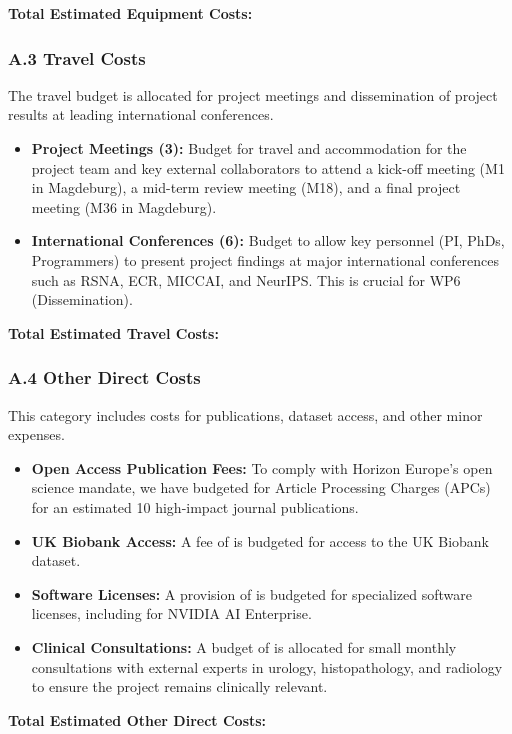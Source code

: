 \documentclass[11pt, a4paper]{article}
\begin{document}
\textbf{Total Estimated Equipment Costs: }

\subsubsection*{A.3 Travel Costs}
The travel budget is allocated for project meetings and dissemination of project results at leading international conferences.
\begin{itemize}
    \item \textbf{Project Meetings (3):} Budget for travel and accommodation for the project team and key external collaborators to attend a kick-off meeting (M1 in Magdeburg), a mid-term review meeting (M18), and a final project meeting (M36 in Magdeburg).
    \item \textbf{International Conferences (6):} Budget to allow key personnel (PI, PhDs, Programmers) to present project findings at major international conferences such as RSNA, ECR, MICCAI, and NeurIPS. This is crucial for WP6 (Dissemination).
\end{itemize}

\textbf{Total Estimated Travel Costs: }

\subsubsection*{A.4 Other Direct Costs}
This category includes costs for publications, dataset access, and other minor expenses.
\begin{itemize}
    \item \textbf{Open Access Publication Fees:} To comply with Horizon Europe's open science mandate, we have budgeted for Article Processing Charges (APCs) for an estimated 10 high-impact journal publications.
    \item \textbf{UK Biobank Access:} A fee of  is budgeted for access to the UK Biobank dataset.
    \item \textbf{Software Licenses:} A provision of  is budgeted for specialized software licenses, including for NVIDIA AI Enterprise.
    \item \textbf{Clinical Consultations:} A budget of  is allocated for small monthly consultations with external experts in urology, histopathology, and radiology to ensure the project remains clinically relevant.
\end{itemize}

\textbf{Total Estimated Other Direct Costs: }
\end{document}
